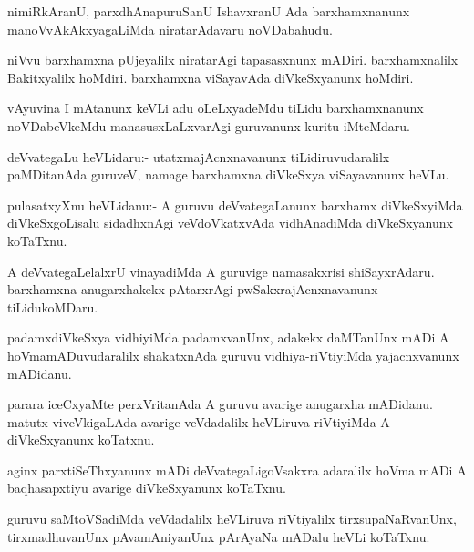 \documentclass{article}
\begin{document}
\begin{mn}
nimiRkAranU, parxdhAnapuruSanU IshavxranU Ada barxhamxnanunx
manoVvAkAkxyagaLiMda niratarAdavaru noVDabahudu.
\end{mn}

\begin{mn}
niVvu barxhamxna pUjeyalilx niratarAgi tapasasxnunx
mADiri. barxhamxnalilx Bakitxyalilx hoMdiri. barxhamxna viSayavAda
diVkeSxyanunx hoMdiri.
\end{mn}

\begin{mn}
vAyuvina I mAtanunx keVLi adu oLeLxyadeMdu tiLidu barxhamxnanunx
noVDabeVkeMdu manasusxLaLxvarAgi guruvanunx kuritu iMteMdaru.
\end{mn}

\begin{mn}
deVvategaLu heVLidaru:- utatxmajAcnxnavanunx tiLidiruvudaralilx
paMDitanAda guruveV, namage barxhamxna diVkeSxya viSayavanunx heVLu.
\end{mn}

\begin{mn}
pulasatxyXnu heVLidanu:- A guruvu deVvategaLanunx barxhamx
diVkeSxyiMda diVkeSxgoLisalu sidadhxnAgi veVdoVkatxvAda vidhAnadiMda
diVkeSxyanunx koTaTxnu.
\end{mn}

\begin{mn}%
A deVvategaLelalxrU vinayadiMda A guruvige namasakxrisi
shiSayxrAdaru. barxhamxna anugarxhakekx pAtarxrAgi
pwSakxrajAcnxnavanunx tiLidukoMDaru.
\end{mn}

\begin{mn}
padamxdiVkeSxya vidhiyiMda padamxvanUnx, adakekx daMTanUnx mADi A
hoVmamADuvudaralilx shakatxnAda guruvu vidhiya-riVtiyiMda
yajacnxvanunx mADidanu.
\end{mn}

\begin{mn}
parara iceCxyaMte perxVritanAda A guruvu avarige anugarxha
mADidanu. matutx viveVkigaLAda avarige veVdadalilx heVLiruva
riVtiyiMda A diVkeSxyanunx koTatxnu.
\end{mn}

\begin{mn}
aginx parxtiSeThxyanunx mADi deVvategaLigoVsakxra adaralilx hoVma mADi
A baqhasapxtiyu avarige diVkeSxyanunx koTaTxnu.
\end{mn}

\begin{mn}
guruvu saMtoVSadiMda veVdadalilx heVLiruva riVtiyalilx
tirxsupaNaRvanUnx, tirxmadhuvanUnx pAvamAniyanUnx pArAyaNa mADalu
heVLi koTaTxnu.
\end{mn}
\end{document}
